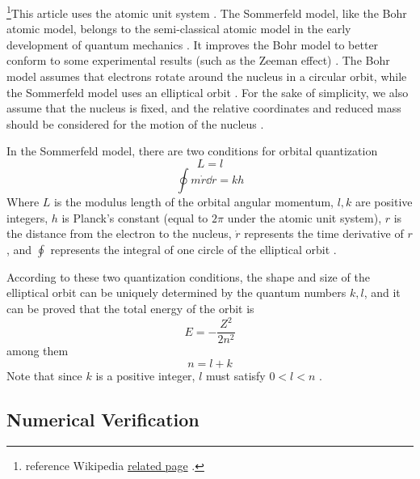 


\footnote{reference Wikipedia \href{https://en .wikipedia .org/wiki/Old_quantum_theory}{related page}
 . }This article uses the atomic unit system  . The Sommerfeld model, like the Bohr atomic model, belongs to the semi-classical atomic model in the early development of quantum mechanics . It improves the Bohr model to better conform to some experimental results (such as the Zeeman effect) . The Bohr model assumes that electrons rotate around the nucleus in a circular orbit, while the Sommerfeld model uses an elliptical orbit . For the sake of simplicity, we also assume that the nucleus is fixed, and the relative coordinates and reduced mass  should be considered for the motion of the nucleus .

In the Sommerfeld model, there are two conditions for orbital quantization
\begin{equation}\label{test2_eq4}
L = l
\end{equation}
\begin{equation}\label{test2_eq3}
\oint m\dot r \dd{r} = kh
\end{equation}
Where $L$ is the modulus length of the orbital angular momentum, $l, k$ are positive integers, $h$ is Planck’s constant (equal to $2\pi$ under the atomic unit system), $r$ is the distance from the electron to the nucleus, $\dot r$ represents the time derivative of $r$, and $\oint$ represents the integral of one circle of the elliptical orbit .

According to these two quantization conditions, the shape and size of the elliptical orbit can be uniquely determined by the quantum numbers $k, l$, and it can be proved that the total energy of the orbit is
\begin{equation}\label{test2_eq5}
E = -\frac{Z^2}{2n^2}
\end{equation}
among them
\begin{equation}\label{test2_eq2}
n = l + k
\end{equation}
Note that since $k$ is a positive integer, $l$ must satisfy $0 <l <n$ .

\subsection{Numerical Verification}

